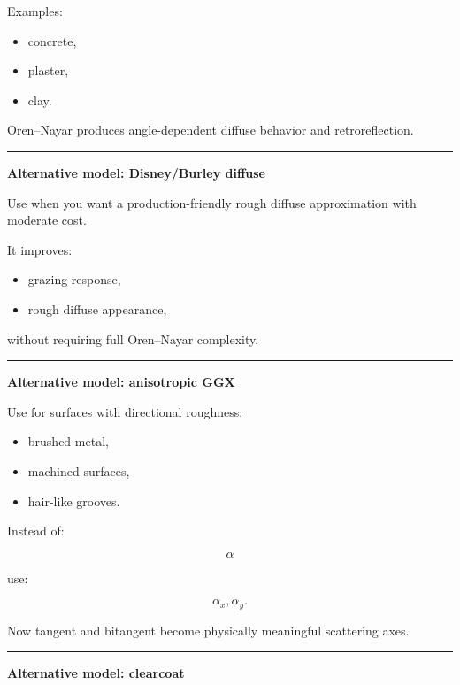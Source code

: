 Examples:

\begin{itemize}
\tightlist
\item
  concrete,
\item
  plaster,
\item
  clay.
\end{itemize}

Oren--Nayar produces angle-dependent diffuse behavior and retroreflection.

\begin{center}\rule{0.5\linewidth}{0.5pt}\end{center}

\textbf{Alternative model: Disney/Burley diffuse}

Use when you want a production-friendly rough diffuse approximation with moderate cost.

It improves:

\begin{itemize}
\tightlist
\item
  grazing response,
\item
  rough diffuse appearance,
\end{itemize}

without requiring full Oren--Nayar complexity.

\begin{center}\rule{0.5\linewidth}{0.5pt}\end{center}

\textbf{Alternative model: anisotropic GGX}

Use for surfaces with directional roughness:

\begin{itemize}
\tightlist
\item
  brushed metal,
\item
  machined surfaces,
\item
  hair-like grooves.
\end{itemize}

Instead of:

\[
\alpha
\]

use:

\[
\alpha_x,\alpha_y.
\]

Now tangent and bitangent become physically meaningful scattering axes.

\begin{center}\rule{0.5\linewidth}{0.5pt}\end{center}

\textbf{Alternative model: clearcoat}


